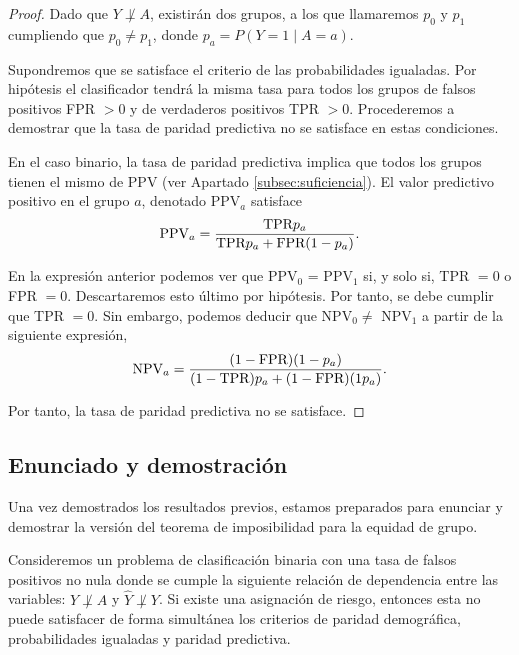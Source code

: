 \documentclass[oneside,openright,titlepage,numbers=noenddot,openany,headinclude,footinclude=true,
cleardoublepage=empty,abstractoff,BCOR=5mm,paper=a4,fontsize=12pt,main=spanish]{scrreprt}
\begin{document}
\begin{proof}
Dado que $Y \not \perp A$, existirán dos grupos, a los que llamaremos $p_0$ y $p_1$ cumpliendo que $p_0\neq p_1$, donde $p_a=P(Y=1 \mid A=a)$.

Supondremos que se satisface el criterio de las probabilidades igualadas. Por hipótesis el clasificador tendrá la misma tasa para todos los grupos de falsos positivos FPR $> 0$ y de verdaderos positivos TPR $> 0$. Procederemos a demostrar que la tasa de paridad predictiva no se satisface en estas condiciones.

En el caso binario, la tasa de paridad predictiva implica que todos los grupos tienen el mismo de PPV (ver Apartado \ref{subsec:suficiencia}). El valor predictivo positivo en el grupo $a$, denotado PPV$_a$ satisface
\begin{equation*}
    \text{PPV}_a = \frac{\displaystyle \text{TPR}p_a}{\displaystyle \text{TPR}p_a+\text{FPR}(1-p_a)}.
\end{equation*}

En la expresión anterior podemos ver que PPV$_0$ = PPV$_1$ si, y solo si, TPR $= 0$ o FPR $= 0$. Descartaremos esto último por hipótesis. Por tanto, se debe cumplir que TPR $= 0$.  Sin embargo, podemos deducir que NPV$_0 \neq$ NPV$_1$ a partir de la siguiente expresión,
\begin{equation*}
    \text{NPV}_a = \frac{\displaystyle (1-\text{FPR})(1-p_a)}{\displaystyle (1-\text{TPR})p_a+(1-\text{FPR})(1p_a)}.
\end{equation*}

Por tanto, la tasa de paridad predictiva no se satisface.
\end{proof}

\subsection{Enunciado y demostración}

Una vez demostrados los resultados previos, estamos preparados para enunciar y demostrar la versión del teorema de imposibilidad para la equidad de grupo.\\

\begin{theorem} \label{th:teoimpos}
Consideremos un problema de clasificación binaria con una tasa de falsos positivos no nula donde se cumple la siguiente relación de dependencia entre las variables: $Y \not \perp A$ y $\hat{Y} \not \perp Y$. Si existe una asignación de riesgo, entonces esta no puede satisfacer de forma simultánea los criterios de paridad demográfica, probabilidades igualadas y paridad predictiva.
\end{theorem}
\end{document}
